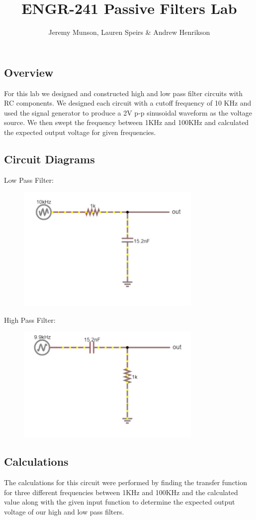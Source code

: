\documentclass[11pt]{article}
\title{ENGR-241 Passive Filters Lab}
\author{Jeremy Munson, Lauren Speirs \& Andrew Henrikson}
\begin{document}
	\maketitle
	\subsection*{Overview}
	For this lab we designed and  constructed high and low pass filter circuits with RC components. We designed each circuit with a cutoff frequency of 10 KHz and used the signal generator to produce a 2V p-p sinusoidal waveform as the voltage source. We then swept the frequency between 1KHz and 100KHz and calculated the expected output voltage for given frequencies.
	\subsection*{Circuit Diagrams}
	Low Pass Filter: 
		\begin{figure}[H]
			\centering
			\includegraphics[width=3.5in]{images/low diagram.PNG}
		\end{figure}
	High Pass Filter:
		\begin{figure}[H]
		    \centering
		    \includegraphics[width=3.5in]{images/high diagram.PNG}
		\end{figure}
	  
	\subsection*{Calculations}
	The calculations for this circuit were performed by finding the transfer function for three different frequencies between 1KHz and 100KHz and the calculated value along with the given input function to determine the expected output voltage of our high and low pass filters.
\end{document}
